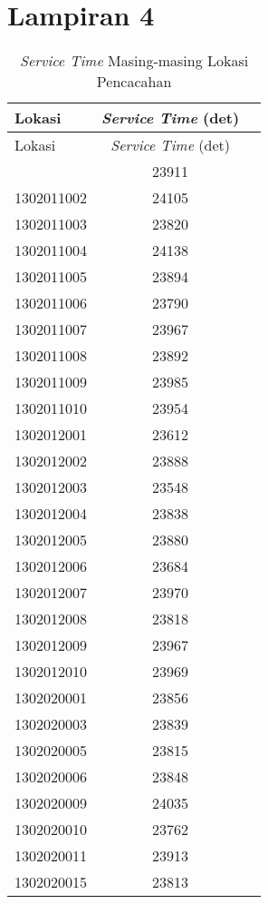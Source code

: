 \chapter*{Lampiran 4}


\begin{longtable}[h]{lcc}
	\caption{\textit{Service Time} Masing-masing Lokasi Pencacahan}
	\label{tbl:location_service_times}\\
	\toprule
		Lokasi & \textit{Service Time} (det)\\ 
	\midrule
	\endfirsthead
	\toprule
		Lokasi & \textit{Service Time} (det)\\ 
	\midrule
	\endhead
	\bottomrule
	\endfoot
		1302011001 & 23911\\
		1302011002 & 24105\\
		1302011003 & 23820\\
		1302011004 & 24138\\
		1302011005 & 23894\\
		1302011006 & 23790\\
		1302011007 & 23967\\
		1302011008 & 23892\\
		1302011009 & 23985\\
		1302011010 & 23954\\
		1302012001 & 23612\\
		1302012002 & 23888\\
		1302012003 & 23548\\
		1302012004 & 23838\\
		1302012005 & 23880\\
		1302012006 & 23684\\
		1302012007 & 23970\\
		1302012008 & 23818\\
		1302012009 & 23967\\
		1302012010 & 23969\\
		1302020001 & 23856\\
		1302020003 & 23839\\
		1302020005 & 23815\\
		1302020006 & 23848\\
		1302020009 & 24035\\
		1302020010 & 23762\\
		1302020011 & 23913\\
		1302020015 & 23813\\

\end{longtable}
